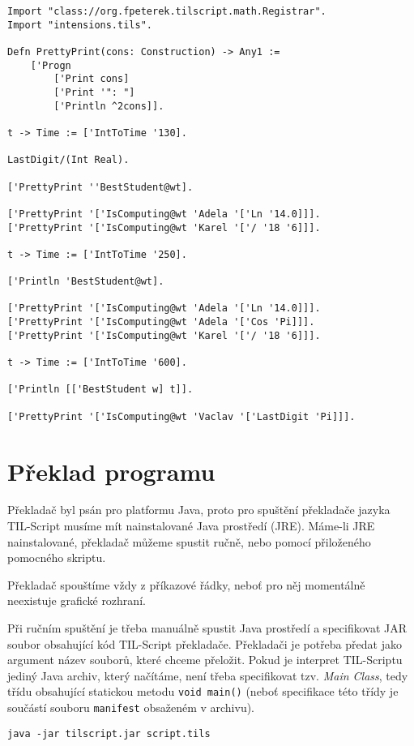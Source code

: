 \begin{lstlisting}[caption={Funkce a uzávěry}, language=Tilscript]
Import "class://org.fpeterek.tilscript.math.Registrar".
Import "intensions.tils".

Defn PrettyPrint(cons: Construction) -> Any1 :=
    ['Progn
        ['Print cons]
        ['Print '": "]
        ['Println ^2cons]].

t -> Time := ['IntToTime '130].

LastDigit/(Int Real).

['PrettyPrint ''BestStudent@wt].

['PrettyPrint '['IsComputing@wt 'Adela '['Ln '14.0]]].
['PrettyPrint '['IsComputing@wt 'Karel '['/ '18 '6]]].

t -> Time := ['IntToTime '250].

['Println 'BestStudent@wt].

['PrettyPrint '['IsComputing@wt 'Adela '['Ln '14.0]]].
['PrettyPrint '['IsComputing@wt 'Adela '['Cos 'Pi]]].
['PrettyPrint '['IsComputing@wt 'Karel '['/ '18 '6]]].

t -> Time := ['IntToTime '600].

['Println [['BestStudent w] t]].

['PrettyPrint '['IsComputing@wt 'Vaclav '['LastDigit 'Pi]]].
\end{lstlisting}

\section{Překlad programu}

Překladač byl psán pro platformu Java, proto pro spuštění překladače jazyka TIL-Script musíme mít
nainstalované Java prostředí (JRE). Máme-li JRE nainstalované, překladač můžeme spustit ručně, nebo
pomocí přiloženého pomocného skriptu.

Překladač spouštíme vždy z příkazové řádky, neboť pro něj momentálně neexistuje grafické rozhraní.

Při ručním spuštění je třeba manuálně spustit Java prostředí a specifikovat JAR soubor obsahující
kód TIL-Script překladače. Překladači je potřeba předat jako argument název souborů, které chceme
přeložit. Pokud je interpret TIL-Scriptu jediný Java archiv, který načítáme, není třeba specifikovat
tzv. \textit{Main Class}, tedy třídu obsahující statickou metodu \lstinline{void main()} (neboť
specifikace této třídy je součástí souboru \lstinline{manifest} obsaženém v archivu).

\begin{lstlisting}[caption={Spuštění překladače}]
java -jar tilscript.jar script.tils
\end{lstlisting}

